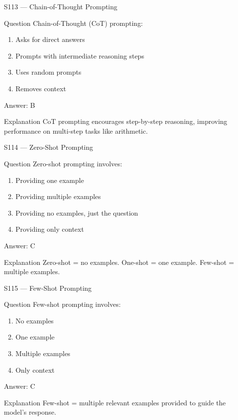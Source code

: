 \documentclass[aspectratio=169,8pt]{beamer}
\begin{document}
	\begin{frame}{S113 --- Chain-of-Thought Prompting}
		\begin{block}{Question}
			Chain-of-Thought (CoT) prompting:
			\begin{enumerate}
				\item Asks for direct answers
				\item Prompts with intermediate reasoning steps
				\item Uses random prompts
				\item Removes context
			\end{enumerate}
		\end{block}
		\begin{exampleblock}{Answer: B}\end{exampleblock}
		\begin{block}{Explanation}
			CoT prompting encourages step-by-step reasoning, improving performance on multi-step tasks like arithmetic.
		\end{block}
	\end{frame}
	
	\begin{frame}{S114 --- Zero-Shot Prompting}
		\begin{block}{Question}
			Zero-shot prompting involves:
			\begin{enumerate}
				\item Providing one example
				\item Providing multiple examples
				\item Providing no examples, just the question
				\item Providing only context
			\end{enumerate}
		\end{block}
		\begin{exampleblock}{Answer: C}\end{exampleblock}
		\begin{block}{Explanation}
			Zero-shot = no examples. One-shot = one example. Few-shot = multiple examples.
		\end{block}
	\end{frame}
	
	\begin{frame}{S115 --- Few-Shot Prompting}
		\begin{block}{Question}
			Few-shot prompting involves:
			\begin{enumerate}
				\item No examples
				\item One example
				\item Multiple examples
				\item Only context
			\end{enumerate}
		\end{block}
		\begin{exampleblock}{Answer: C}\end{exampleblock}
		\begin{block}{Explanation}
			Few-shot = multiple relevant examples provided to guide the model's response.
		\end{block}
	\end{frame}
	
\end{document}
